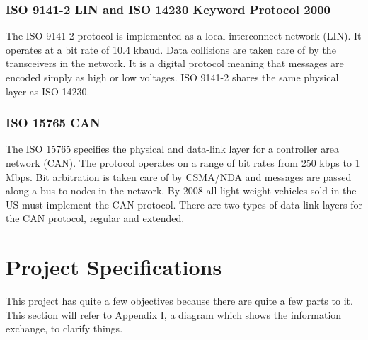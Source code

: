 \documentclass[12pt,letterpaper]{article}
\begin{document}
\subsubsection{ISO 9141-2 LIN and ISO 14230 Keyword Protocol 2000}
The ISO 9141-2 protocol is implemented as a local interconnect network (LIN). It operates at a bit rate of 10.4 kbaud. Data collisions are taken care of by the transceivers in the network. It is a digital protocol meaning that messages are encoded simply as high or low voltages. ISO 9141-2 shares the same physical layer as ISO 14230.

\subsubsection{ISO 15765 CAN}
The ISO 15765 specifies the physical and data-link layer for a controller area network (CAN). The protocol operates on a range of bit rates from 250 kbps to 1 Mbps. Bit arbitration is taken care of by CSMA/NDA and messages are passed along a bus to nodes in the network. By 2008 all light weight vehicles sold in the US must implement the CAN protocol. There are two types of data-link layers for the CAN protocol, regular and extended.

\section{Project Specifications}
This project has quite a few objectives because there are quite a few parts to it. This section will refer to Appendix I, a diagram which shows the information exchange, to clarify things.
\end{document}
